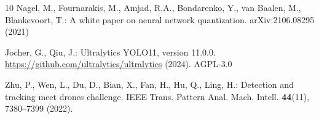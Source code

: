 \documentclass{svproc}
\begin{document}
\begin{thebibliography}{10}
Nagel, M., Fournarakis, M., Amjad, R.A., Bondarenko, Y., van Baalen, M., Blankevoort, T.:
A white paper on neural network quantization. arXiv:2106.08295 (2021)

Jocher, G., Qiu, J.: Ultralytics YOLO11, version 11.0.0. \url{https://github.com/ultralytics/ultralytics} (2024). AGPL-3.0

Zhu, P., Wen, L., Du, D., Bian, X., Fan, H., Hu, Q., Ling, H.:
Detection and tracking meet drones challenge.
IEEE Trans. Pattern Anal. Mach. Intell. \textbf{44}(11), 7380--7399 (2022). 

\end{thebibliography}
\end{document}
